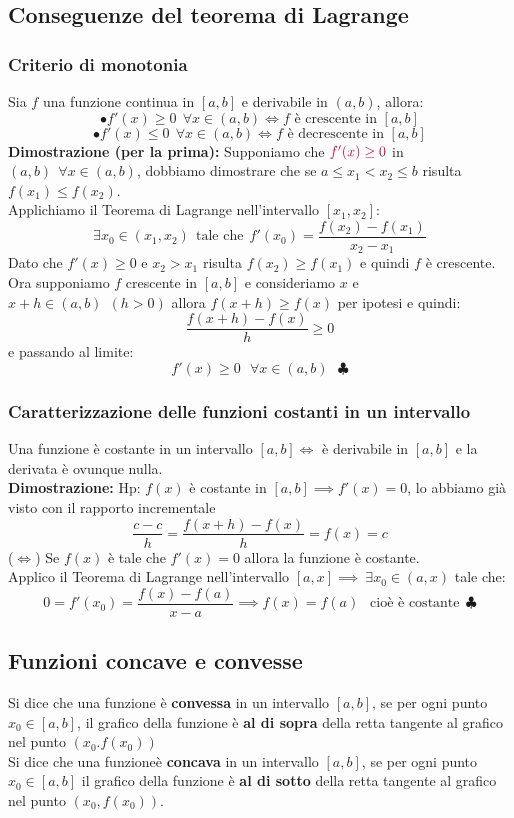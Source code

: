 \documentclass[../../main.tex]{subfiles}
\begin{document}
\subsection{Conseguenze del teorema di Lagrange}
\subsubsection{Criterio di monotonia}
Sia $f$ una funzione continua in $[a, b]$ e derivabile in $(a, b)$, allora:
\[
    \bullet f'(x) \geq 0 \ \ \forall x\in(a, b) \iff f \text{ è crescente in } [a, b]
\]
\[
    \bullet f'(x) \leq 0 \ \ \forall x\in(a, b) \iff f \text{ è decrescente in } [a, b]
\]
\textbf{Dimostrazione (per la prima):} Supponiamo che $\textcolor{purple}{f'(x) \geq 0}$ in $(a, b) \ \ \forall x\in(a, b)$, dobbiamo dimostrare che se
$a \leq x_1 < x_2 \leq b$ risulta $f(x_1) \leq f(x_2)$.\\
Applichiamo il Teorema di Lagrange nell'intervallo $[x_1, x_2]$:
\[
    \exists x_0\in(x_1, x_2) \ \ \text{tale che} \ \ f'(x_0) = \dfrac{f(x_2) - f(x_1)}{x_2 - x_1}
\]
Dato che $f'(x) \geq 0$ e $x_2 > x_1$ risulta $f(x_2) \geq f(x_1)$ e quindi $f$ è crescente. \\

Ora supponiamo $f$ crescente in $[a, b]$ e consideriamo $x$ e $x+h \in (a, b) \ \ (h>0)$ allora
$f(x+h) \geq f(x)$ per ipotesi e quindi:
\[
    \dfrac{f(x+h) - f(x)}{h} \geq 0
\]
e passando al limite:
\[
    f'(x) \geq 0 \ \ \ \forall x\in(a, b) \ \ \ \clubsuit
\]
\subsubsection{Caratterizzazione delle funzioni costanti in un intervallo}
Una funzione è costante in un intervallo $[a, b] \iff$ è derivabile in $[a, b]$ e la derivata è ovunque nulla.\\
\textbf{Dimostrazione:} Hp: $f(x)$ è costante in $[a, b] \implies f'(x) = 0$, lo abbiamo già visto con il rapporto incrementale
\[
    \dfrac{c-c}{h} = \dfrac{f(x+h) - f(x)}{h} = f(x) = c
\]
($\iff$) Se $f(x)$ è tale che $f'(x) = 0$ allora la funzione è costante.\\
Applico il Teorema di Lagrange nell'intervallo $[a, x] \implies \ \exists x_0\in(a,x)$ tale che:
\[
    0 = f'(x_0) = \dfrac{f(x)-f(a)}{x-a} \implies f(x) = f(a) \ \ \text{ cioè è costante} \ \ \clubsuit
\]


\subsection{Funzioni concave e convesse}
Si dice che una funzione è \textbf{convessa} in un intervallo $[a, b]$, se per ogni punto $x_0\in[a, b]$, il grafico della funzione
è \textbf{al di sopra} della retta tangente al grafico nel punto $(x_0. f(x_0))$\\
Si dice che una funzioneè \textbf{concava} in un intervallo $[a, b]$, se per ogni punto $x_0\in[a, b]$ il grafico della funzione è \textbf{al di sotto} della retta tangente
al grafico nel punto $(x_0, f(x_0))$.\\
\end{document}
